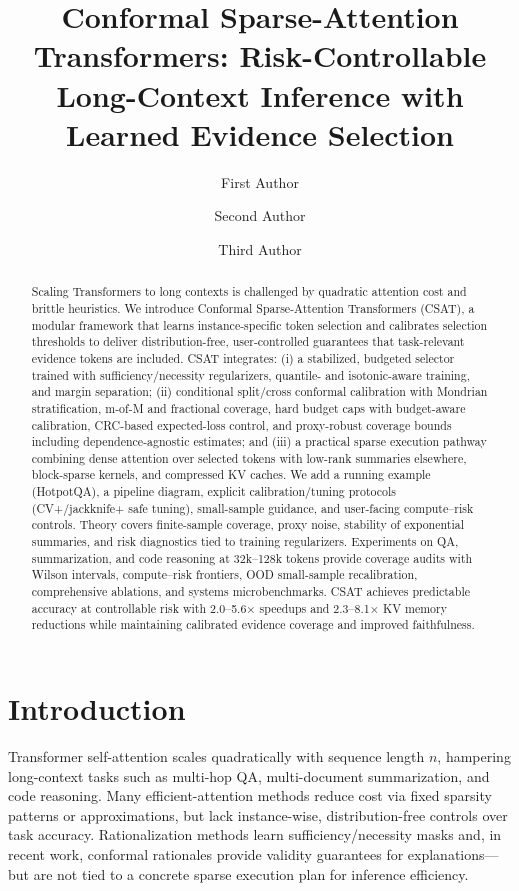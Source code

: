 \documentclass[11pt]{article}
\title{Conformal Sparse-Attention Transformers: Risk-Controllable Long-Context Inference with Learned Evidence Selection}
\author[1]{First Author}
\author[1]{Second Author}
\author[2]{Third Author}
\affil[1]{Department of Computer Science, University A}
\affil[2]{Research Lab B}
\date{}
\begin{document}
\maketitle

\begin{abstract}
Scaling Transformers to long contexts is challenged by quadratic attention cost and brittle heuristics. We introduce Conformal Sparse-Attention Transformers (CSAT), a modular framework that learns instance-specific token selection and calibrates selection thresholds to deliver distribution-free, user-controlled guarantees that task-relevant evidence tokens are included. CSAT integrates: (i) a stabilized, budgeted selector trained with sufficiency/necessity regularizers, quantile- and isotonic-aware training, and margin separation; (ii) conditional split/cross conformal calibration with Mondrian stratification, m-of-M and fractional coverage, hard budget caps with budget-aware calibration, CRC-based expected-loss control, and proxy-robust coverage bounds including dependence-agnostic estimates; and (iii) a practical sparse execution pathway combining dense attention over selected tokens with low-rank summaries elsewhere, block-sparse kernels, and compressed KV caches. We add a running example (HotpotQA), a pipeline diagram, explicit calibration/tuning protocols (CV+/jackknife+ safe tuning), small-sample guidance, and user-facing compute–risk controls. Theory covers finite-sample coverage, proxy noise, stability of exponential summaries, and risk diagnostics tied to training regularizers. Experiments on QA, summarization, and code reasoning at 32k–128k tokens provide coverage audits with Wilson intervals, compute–risk frontiers, OOD small-sample recalibration, comprehensive ablations, and systems microbenchmarks. CSAT achieves predictable accuracy at controllable risk with 2.0–5.6× speedups and 2.3–8.1× KV memory reductions while maintaining calibrated evidence coverage and improved faithfulness.
\end{abstract}

\section{Introduction}
Transformer self-attention scales quadratically with sequence length $n$, hampering long-context tasks such as multi-hop QA, multi-document summarization, and code reasoning. Many efficient-attention methods reduce cost via fixed sparsity patterns or approximations, but lack instance-wise, distribution-free controls over task accuracy. Rationalization methods learn sufficiency/necessity masks and, in recent work, conformal rationales provide validity guarantees for explanations—but are not tied to a concrete sparse execution plan for inference efficiency.
\end{document}
